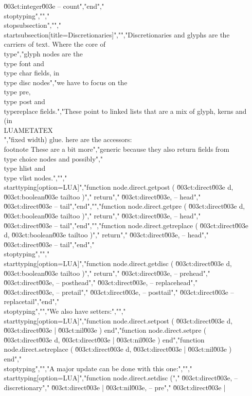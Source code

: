  \u003ct:integer\u003e -- count","end","\\stoptyping","","\\stopsubsection","","\\startsubsection[title=Discretionaries]","","Discretionaries and glyphs are the carriers of text. Where the core of \\type","{glyph} nodes are the \\type {font} and \\type {char} fields, in \\type {disc} nodes","we have to focus on the \\type {pre}, \\type {post} and \\type{replace} fields.","These point to linked lists that are a mix of glyph, kerns and (in \\LUAMETATEX\\","fixed width) glue. here are the accessors: \\footnote {These are a bit more","generic because they also return fields from \\type {choice} nodes and possibly","\\type {hlist} and \\type {vlist} nodes.}","","\\starttyping[option=LUA]","function node.direct.getpost ( \u003ct:direct\u003e d, \u003ct:boolean\u003e tailtoo )","    return","        \u003ct:direct\u003e, -- head","        \u003ct:direct\u003e  -- tail","end","","function node.direct.getpre ( \u003ct:direct\u003e d, \u003ct:boolean\u003e tailtoo )","    return","        \u003ct:direct\u003e, -- head","        \u003ct:direct\u003e  -- tail","end","","function node.direct.getreplace ( \u003ct:direct\u003e d, \u003ct:boolean\u003e tailtoo )","    return","        \u003ct:direct\u003e, -- head","        \u003ct:direct\u003e  -- tail","end","\\stoptyping","","\\starttyping[option=LUA]","function node.direct.getdisc ( \u003ct:direct\u003e d, \u003ct:boolean\u003e tailtoo )","    return","        \u003ct:direct\u003e, -- prehead","        \u003ct:direct\u003e, -- posthead","        \u003ct:direct\u003e, -- replacehead","        \u003ct:direct\u003e, -- pretail","        \u003ct:direct\u003e, -- posttail","        \u003ct:direct\u003e  -- replacetail","end","\\stoptyping","","We also have setters:","","\\starttyping[option=LUA]","function node.direct.setpost    ( \u003ct:direct\u003e d, \u003ct:direct\u003e | \u003ct:nil\u003e ) end","function node.direct.setpre     ( \u003ct:direct\u003e d, \u003ct:direct\u003e | \u003ct:nil\u003e ) end","function node.direct.setreplace ( \u003ct:direct\u003e d, \u003ct:direct\u003e | \u003ct:nil\u003e ) end","\\stoptyping","","A major update can be done with this one:","","\\starttyping[option=LUA]","function node.direct.setdisc (","    \u003ct:direct\u003e,            -- discretionary","    \u003ct:direct\u003e  | \u003ct:nil\u003e, -- pre","    \u003ct:direct\u003e  | 